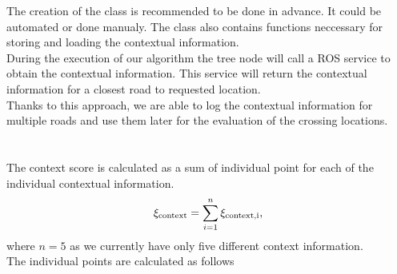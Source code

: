            The creation of the class is recommended to be done in advance. It could be automated or done manualy. The class also contains functions neccessary for storing and loading the contextual information.\\
            During the execution of our algorithm the tree node will call a ROS service to obtain the contextual information. This service will return the contextual information for a closest road to requested location.\\
            Thanks to this approach, we are able to log the contextual information for multiple roads and use them later for the evaluation of the crossing locations.\\\\
        \\
            The context score is calculated as a sum of individual point for each of the individual contextual information.
            \begin{equation}
                \xi_{\rm{context}} = \sum_{i=1}^{n} \xi_{\rm{context},i},
            \end{equation}
            where $n=5$ as we currently have only five different context information.\\
            The individual points are calculated as follows
